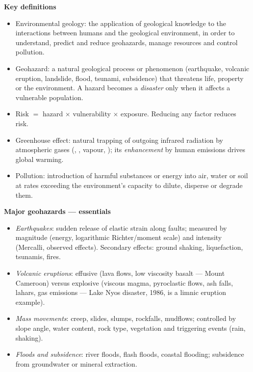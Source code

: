 \documentclass[11pt]{article}
\newcommand{\cle}[1]{{\popxbold\color{popdark}#1}}
\begin{document}
\begin{aretenir}
\textbf{Key definitions}
\begin{itemize}
\item \cle{Environmental geology}: the application of geological knowledge to the interactions between humans and the geological environment, in order to understand, predict and reduce \cle{geohazards}, manage resources and control pollution.
\item \cle{Geohazard}: a natural geological process or phenomenon (earthquake, volcanic eruption, landslide, flood, tsunami, subsidence) that threatens life, property or the environment. A hazard becomes a \emph{disaster} only when it affects a vulnerable population.
\item \cle{Risk} $=$ hazard $\times$ vulnerability $\times$ exposure. Reducing any factor reduces risk.
\item \cle{Greenhouse effect}: natural trapping of outgoing infrared radiation by atmospheric gases (, ,  vapour, ); its \emph{enhancement} by human emissions drives \cle{global warming}.
\item \cle{Pollution}: introduction of harmful substances or energy into air, water or soil at rates exceeding the environment's capacity to dilute, disperse or degrade them.
\end{itemize}

\textbf{Major geohazards — essentials}
\begin{itemize}
\item \emph{Earthquakes}: sudden release of elastic strain along faults; measured by magnitude (energy, logarithmic Richter/moment scale) and intensity (Mercalli, observed effects). Secondary effects: ground shaking, liquefaction, tsunamis, fires.
\item \emph{Volcanic eruptions}: effusive (lava flows, low viscosity basalt — Mount Cameroon) versus explosive (viscous magma, pyroclastic flows, ash falls, lahars, gas emissions — Lake Nyos  disaster, 1986, is a limnic eruption example).
\item \emph{Mass movements}: creep, slides, slumps, rockfalls, mudflows; controlled by slope angle, water content, rock type, vegetation and triggering events (rain, shaking).
\item \emph{Floods and subsidence}: river floods, flash floods, coastal flooding; subsidence from groundwater or mineral extraction.
\end{itemize}


\end{aretenir}
\end{document}
